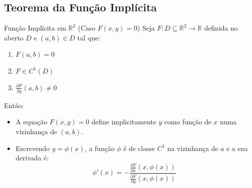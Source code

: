 \documentclass[11pt,a4paper]{article}
\newcommand{\R}{\mathbb{R}}
\begin{document}
\subsection{Teorema da Função Implícita}

\noindent\begin{definitionbox}{Função Implícita em $\R^2$ (Caso $F(x,y)=0$)}
  Seja $F : D \subseteq \R^2 \to \R$ definida no aberto $D$ e $(a, b) \in D$ tal que:
  \begin{enumerate}
    \item $F(a, b) = 0$
    \item $F \in C^1(D)$
    \item $\frac{\partial F}{\partial y}(a, b) \neq 0$
  \end{enumerate}
  Então:
  \begin{itemize}
    \item A equação $F(x, y) = 0$ define implicitamente $y$ como função de $x$ numa vizinhança de $(a, b)$.
    \item Escrevendo $y = \phi(x)$, a função $\phi$ é de classe $C^1$ na vizinhança de $a$ e a sua derivada é:
      \[ \phi'(x) = - \frac{\frac{\partial F}{\partial x}(x, \phi(x))}{\frac{\partial F}{\partial y}(x, \phi(x))} \]
  \end{itemize}
\end{definitionbox}
\end{document}

